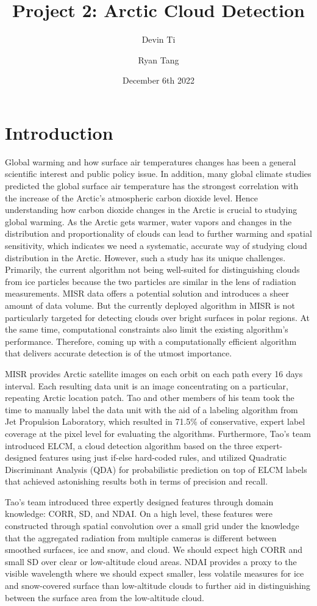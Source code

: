 \documentclass[11pt, letterpaper, journal]{IEEEtran}
\title{Project 2: Arctic Cloud Detection}
\author[1]{Devin Ti}
\author[1]{Ryan Tang}
\affil[1]{Duke University, Statistical Science}
\date{December 6th 2022}
\begin{document}
\maketitle

\section{Introduction}
Global warming and how surface air temperatures changes has been a general scientific interest and public policy issue. In addition, many global climate studies predicted the global surface air temperature has the strongest correlation with the increase of the Arctic's atmospheric carbon dioxide level. Hence understanding how carbon dioxide changes in the Arctic is crucial to studying global warming. As the Arctic gets warmer, water vapors and changes in the distribution and proportionality of clouds can lead to further warming and spatial sensitivity, which indicates we need a systematic, accurate way of studying cloud distribution in the Arctic. However, such a study has its unique challenges. Primarily, the current algorithm not being well-suited for distinguishing clouds from ice particles because the two particles are similar in the lens of radiation measurements. MISR data offers a potential solution and introduces a sheer amount of data volume. But the currently deployed algorithm in MISR is not particularly targeted for detecting clouds over bright surfaces in polar regions. At the same time, computational constraints also limit the existing algorithm's performance. Therefore, coming up with a computationally efficient algorithm that delivers accurate detection is of the utmost importance.

MISR provides Arctic satellite images on each orbit on each path every 16 days interval. Each resulting data unit is an image concentrating on a particular, repeating Arctic location patch. Tao and other members of his team took the time to manually label the data unit with the aid of a labeling algorithm from Jet Propulsion Laboratory, which resulted in 71.5\% of conservative, expert label coverage at the pixel level for evaluating the algorithms. Furthermore, Tao's team introduced ELCM, a cloud detection algorithm based on the three expert-designed features using just if-else hard-coded rules, and utilized Quadratic Discriminant Analysis (QDA) for probabilistic prediction on top of ELCM labels that achieved astonishing results both in terms of precision and recall.

Tao's team introduced three expertly designed features through domain knowledge: CORR, SD, and NDAI. On a high level, these features were constructed through spatial convolution over a small grid under the knowledge that the aggregated radiation from multiple cameras is different between smoothed surfaces, ice and snow, and cloud. We should expect high CORR and small SD over clear or low-altitude cloud areas. NDAI provides a proxy to the visible wavelength where we should expect smaller, less volatile measures for ice and snow-covered surface than low-altitude clouds to further aid in distinguishing between the surface area from the low-altitude cloud.
\end{document}
